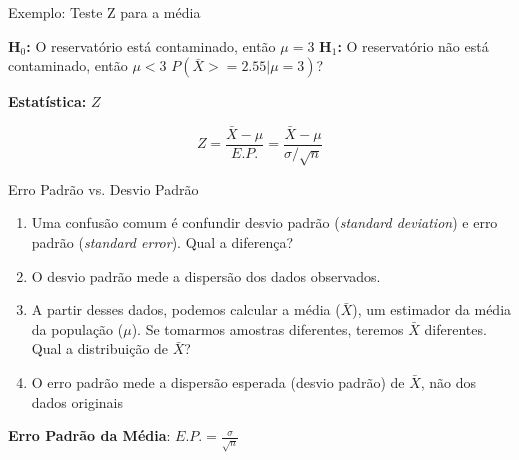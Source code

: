 \documentclass{beamer}
\begin{document}
\begin{frame}{Exemplo: Teste Z para a média}

\textbf{H$_0$:} O reservatório está contaminado, então $\mu = 3$
\vfill
\textbf{H$_1$:} O reservatório não está contaminado, então $\mu < 3$
\vfill
$P(\bar{X} >= 2.55 | \mu = 3)$?
\vfill

\textbf{Estatística:} $Z$

\vfill

\begin{equation*}
    Z = \frac{\bar{X} - \mu}{E.P.} = \frac{\bar{X} - \mu}{\sigma / \sqrt{n}}
\end{equation*}

\vfill


\end{frame} 

\begin{frame}{Erro Padrão vs. Desvio Padrão}

\begin{small}
  \begin{enumerate}
  \item Uma confusão comum é confundir desvio padrão (\emph{standard deviation}) e erro padrão (\emph{standard error}). Qual a diferença? \pause
  \vfill
  \item O desvio padrão mede a dispersão dos dados observados.
  \vfill
  \item A partir desses dados, podemos calcular a média ($\bar{X}$), um estimador da média da população ($\mu$). Se tomarmos amostras diferentes, teremos $\bar{X}$ diferentes. Qual a distribuição de $\bar{X}$?
  \pause
  \item O erro padrão mede a dispersão esperada (desvio padrão) de $\bar{X}$, não dos dados originais
\end{enumerate}
\end{small}

\vfill

\textbf{Erro Padrão da Média}:
\centering
$ E.P. = \frac{\sigma}{\sqrt{n}}$ 

\end{frame} 
\end{document}
